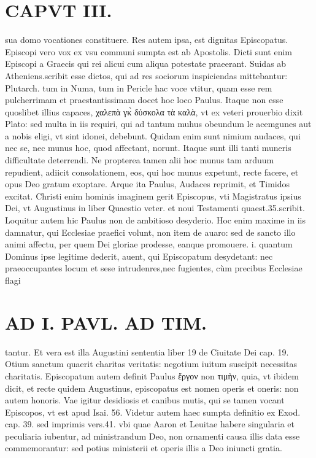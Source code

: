 \documentclass{article}
\begin{document}
\begin{pages}
\section*{CAPVT  III. }
\marginpar{[ p.99 ]}\pstart sua domo vocationes constituere.  \pend\pstart Res autem ipsa, est dignitas Episcopatus. Episcopi vero vox ex vsu communi sumpta est ab Apostolis. Dicti sunt enim Episcopi a Graecis qui rei alicui cum aliqua potestate praeerant. Suidas ab Atheniens.scribit esse dictos, qui ad res sociorum inspiciendas mittebantur: Plutarch. tum in Numa, tum in Pericle hac voce vtitur, quam esse rem pulcherrimam et praestantissimam docet hoc loco Paulus. Itaque non esse quoslibet illius capaces, χαλεπὰ γκ̀ δύσκολα τὰ καλὰ, vt ex veteri prouerbio dixit Plato: sed multa in iis requiri, qui ad tantum muhus obeundum le acemgunes aut a nobis eligi, vt sint idonei, debebunt. Quidam enim sunt nimium audaces, qui nec se, nec munus hoc, quod affectant, norunt. Itaque sunt illi tanti muneris difficultate deterrendi.  \pend\pstart Ne propterea tamen alii hoc munus tam arduum repudient, adiicit consolationem, eos, qui hoc munus expetunt, recte facere, et opus Deo gratum exoptare. Arque ita Paulus, Audaces reprimit, et Timidos excitat. Christi enim hominis imaginem gerit Episcopus, vti Magistratus ipsius Dei, vt Augustinus in liber  Quaestio veter. et noui Testamenti quaest.35.scribit. Loquitur autem hic Paulus non de ambitioso desyderio. Hoc enim maxime in iis damnatur, qui Ecclesiae praefici volunt, non item de auaro: sed de sancto illo animi affectu, per quem Dei gloriae prodesse, eanque promouere. i. quantum Dominus ipse legitime dederit, auent, qui Episcopatum desydetant: nec praeoccupantes locum et sese intrudenres,nec fugientes, cùm precibus Ecclesiae flagi\pend
\section*{AD I. PAVL. AD TIM. }
\marginpar{[ p.100 ]}\pstart tantur. Et vera est illa Augustini sententia liber 19 de Ciuitate Dei cap. 19. Otium sanctum quaerit charitas veritatis: negotium iuitum suscipit necessitas charitatis.  \pend\pstart Episcopatum autem definit Paulus ἔργον non τιμὴν, quia, vt ibidem dicit, et recte quidem Augustinus, episcopatus est nomen operis et oneris: non autem honoris. Vae igitur desidiosis et canibus mutis, qui se tamen vocant Episcopos, vt est apud Isai. 56. Videtur autem haec sumpta definitio ex Exod. cap. 39. sed imprimis vers.41. vbi quae Aaron et Leuitae habere singularia et peculiaria iubentur, ad ministrandum Deo, non ornamenti causa illis data esse commemorantur: sed potius ministerii et operis illis a Deo iniuncti gratia.  \pend
{}
{}

\end{pages}
\end{document}

